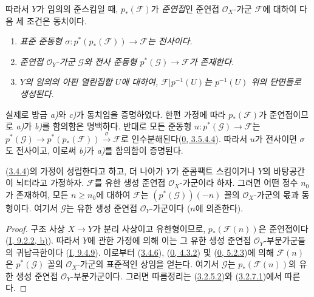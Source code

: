
따라서 $Y$가 임의의 준스킴일 때, $p_*(\mathcal{F})$가
\emph{준연접}인 준연접 $\mathcal{O}_X$-가군 $\mathcal{F}$에 대하여 다음 세
조건은 동치이다.
\begin{enumerate}
  \item[a)] \emph{표준 준동형
    $\sigma:p^*(p_*(\mathcal{F}))\to\mathcal{F}$는 전사이다.}
  \item[b)] \emph{준연접 $\mathcal{O}_Y$-가군 $\mathcal{G}$와 전사 준동형
    $p^*(\mathcal{G})\to\mathcal{F}$가 존재한다.}
  \item[c)] \emph{$Y$의 임의의 아핀 열린집합 $U$에 대하여,
    $\mathcal{F}|p^{-1}(U)$는 $p^{-1}(U)$ 위의 단면들로 생성된다.}
\end{enumerate}
실제로 방금 \emph{a)}와 \emph{c)}가 동치임을 증명하였다. 한편 가정에 따라
$p_*(\mathcal{F})$가 준연접이므로 \emph{a)}가 \emph{b)}를 함의함은 명백하다.
반대로 모든 준동형 $u:p^*(\mathcal{G})\to\mathcal{F}$는
$p^*(\mathcal{G})\to p^*(p_*(\mathcal{F}))\xrightarrow{\sigma}\mathcal{F}$로
인수분해된다(\hyperref[0.3.5.4.4-ko]{0, 3.5.4.4}). 따라서 $u$가 전사이면
$\sigma$도 전사이고, 이로써 \emph{b)}가 \emph{a)}를 함의함이 증명된다.

\begin{corollary}[3.4.8]
\label{II.3.4.8-ko}
(\hyperref[II.3.4.4-ko]{3.4.4})의 가정이 성립한다고 하고, 더 나아가
$Y$가 준콤팩트 스킴이거나 $Y$의 바탕공간이 뇌터라고 가정하자.
$\mathcal{F}$를 유한 생성 준연접 $\mathcal{O}_X$-가군이라 하자. 그러면
어떤 정수 $n_0$가 존재하여, 모든 $n\geq n_0$에 대하여 $\mathcal{F}$는
$(p^*(\mathcal{G}))(-n)$ 꼴의 $\mathcal{O}_X$-가군의 몫과 동형이다. 여기서
$\mathcal{G}$는 유한 생성 준연접 $\mathcal{O}_Y$-가군이다
($n$에 의존한다).
\end{corollary}

\begin{proof}
구조 사상 $X\to Y$가 분리 사상이고 유한형이므로,
$p_*(\mathcal{F}(n))$은 준연접이다
(\hyperref[I.9.2.2-ko]{I, 9.2.2, b)}). 따라서 $Y$에 관한 가정에 의해 이는
그 유한 생성 준연접 $\mathcal{O}_Y$-부분가군들의 귀납극한이다
(\hyperref[I.9.4.9-ko]{I, 9.4.9}). 이로부터
(\hyperref[II.3.4.6-ko]{3.4.6}),
(\hyperref[0.4.3.2-ko]{0, 4.3.2}) 및
(\hyperref[0.5.2.3-ko]{0, 5.2.3})에 의해 $\mathcal{F}(n)$은
$p^*(\mathcal{G})$ 꼴의 $\mathcal{O}_X$-가군의 표준적인 상임을 얻는다.
여기서 $\mathcal{G}$는 $p_*(\mathcal{F}(n))$의 유한 생성 준연접
$\mathcal{O}_Y$-부분가군이다. 그러면 따름정리는
(\hyperref[II.3.2.5.2-ko]{3.2.5.2})와
(\hyperref[II.3.2.7.1-ko]{3.2.7.1})에서 따른다.
\end{proof}

